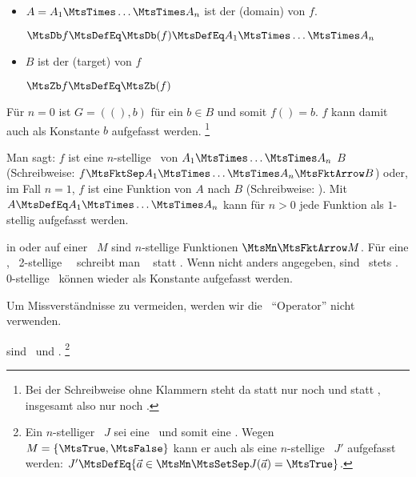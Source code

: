 \begin{description}
\begin{itemize}
		$f\vec{a} \MtsDefEq f a_1 \dots a_n \MtsDefEq f(\vec{a}) \MtsDefEq f(a_1,\dots,a_n) \MtsDefEq b$
		\footnote{%
			$f(a_1,\dots,a_n)$ und $f(a_1,\dots,a_n,b)$ sind wohl zu unterscheiden.
			Ersteres ist ein Funktionsaufruf mit einem Funktionswert, letzteres eine Relation mit einem Wahrheitswert.
		}

		\item $A = A_1 \MtsTimes \dots \MtsTimes A_n$ ist der  (domain) von $f$.

		$\MtsDb f \MtsDefEq \MtsDb(f) \MtsDefEq A_1 \MtsTimes \dots \MtsTimes A_n$

		\item $B$ ist der  (target) von $f$

		$\MtsZb f \MtsDefEq \MtsZb(f)$
	\end{itemize}
	Für $n = 0$ ist $G = ((),b)$ für ein $b \in B$ und somit $f() = b$. $f$ kann damit auch als Konstante $b$ aufgefasst werden.%
	\footnote{%
		Bei der Schreibweise ohne Klammern steht da statt  nur noch  und statt , insgesamt also nur noch .
	}

	Man sagt: $f$ ist eine $n$-stellige \Funktion\ von $A_1 \MtsTimes \dots \MtsTimes A_n$  $B$ (Schreibweise: $\FunktionDef{f}{A_1 \MtsTimes \dots \MtsTimes A_n}{B}$) oder, im Fall $n=1$, $f$ ist eine Funktion von $A$ nach $B$ (Schreibweise: ).
	Mit $A \MtsDefEq A_1 \MtsTimes \dots \MtsTimes A_n$ kann für $n > 0$ jede Funktion als $1$-stellig aufgefasst werden.

	\item [\Operationen] in oder auf einer \Menge\ $M$ sind $n$-stellige Funktionen $\MtsMn \MtsFktArrow M$.
	Für eine , \textdh\ 2-stellige \Operation\ \BspOpB\ schreibt man \textiAlg\  statt .
	Wenn nicht anders angegeben, sind \Operationen\ stets \binaer.
	0-stellige \Operationen\ können wieder als Konstante aufgefasst werden.

	Um Missverständnisse zu vermeiden, werden wir die \Bezeichnung\ "`Operator"' nicht verwenden.

	\item [\Junktoren] sind \aussagenlogischeRelationen\ und \aOperationen.%
	\footnote{\label{def:Junktor}%
		Ein $n$-stelliger \Junktor\ $J$ sei eine \Operation\ und somit eine \Funktion.
		Wegen $M = \{\MtsTrue,\MtsFalse\}$ kann er auch als eine $n$-stellige \Relation\ $J'$ aufgefasst werden:
		$J' \MtsDefEq \MengeDef{\vec{a} \in \MtsMn}{J(\vec{a}) = \MtsTrue}$.

}
\end{description}
